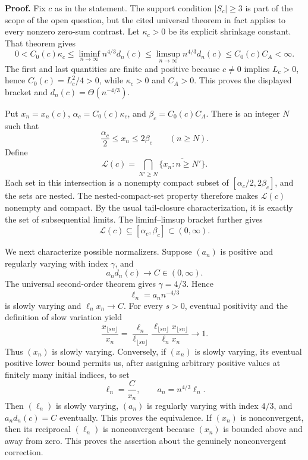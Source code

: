 \textbf{Proof.}
Fix \(c\) as in the statement. The support condition \(|S_c|\geq3\) is part of the scope of the open question, but the cited universal theorem in fact applies to every nonzero zero-sum contrast. Let \(\kappa_c>0\) be its explicit shrinkage constant. That theorem gives
\[
 0<C_0(c)\kappa_c
 \leq\liminf_{n\to\infty}n^{4/3}d_n(c)
 \leq\limsup_{n\to\infty}n^{4/3}d_n(c)
 \leq C_0(c)C_A<\infty.
\]
The first and last quantities are finite and positive because \(c\neq0\) implies \(L_c>0\), hence \(C_0(c)=L_c^2/4>0\), while \(\kappa_c>0\) and \(C_A>0\). This proves the displayed bracket and \(d_n(c)=\Theta(n^{-4/3})\).

Put \(x_n=x_n(c)\), \(\alpha_c=C_0(c)\kappa_c\), and \(\beta_c=C_0(c)C_A\). There is an integer \(N\) such that
\[
 \frac{\alpha_c}{2}\leq x_n\leq2\beta_c
 \qquad(n\geq N).
\]
Define
\[
 \mathcal L(c)=\bigcap_{N'\geq N}
 \overline{\{x_n:n\geq N'\}}.
\]
Each set in this intersection is a nonempty compact subset of \([\alpha_c/2,2\beta_c]\), and the sets are nested. The nested-compact-set property therefore makes \(\mathcal L(c)\) nonempty and compact. By the usual tail-closure characterization, it is exactly the set of subsequential limits. The liminf--limsup bracket further gives
\[
 \mathcal L(c)\subseteq[\alpha_c,\beta_c]\subset(0,\infty).
\]

We next characterize possible normalizers. Suppose \((a_n)\) is positive and regularly varying with index \(\gamma\), and
\[
 a_nd_n(c)\longrightarrow C\in(0,\infty).
\]
The universal second-order theorem gives \(\gamma=4/3\). Hence
\[
 \ell_n=a_nn^{-4/3}
\]
is slowly varying and \(\ell_nx_n\to C\). For every \(s>0\), eventual positivity and the definition of slow variation yield
\[
 \frac{x_{\lfloor sn\rfloor}}{x_n}
 =\frac{\ell_n}{\ell_{\lfloor sn\rfloor}}
 \frac{\ell_{\lfloor sn\rfloor}x_{\lfloor sn\rfloor}}
 {\ell_nx_n}
 \longrightarrow1.
\]
Thus \((x_n)\) is slowly varying. Conversely, if \((x_n)\) is slowly varying, its eventual positive lower bound permits us, after assigning arbitrary positive values at finitely many initial indices, to set
\[
 \ell_n=\frac{C}{x_n},
 \qquad a_n=n^{4/3}\ell_n.
\]
Then \((\ell_n)\) is slowly varying, \((a_n)\) is regularly varying with index \(4/3\), and \(a_nd_n(c)=C\) eventually. This proves the equivalence. If \((x_n)\) is nonconvergent, then its reciprocal \((\ell_n)\) is nonconvergent because \((x_n)\) is bounded above and away from zero. This proves the assertion about the genuinely nonconvergent correction.


